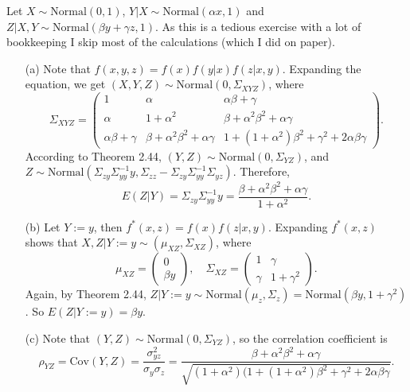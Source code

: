 Let $X \sim \mathrm{Normal}(0, 1)$, $Y|X \sim \mathrm{Normal}(\alpha x, 1)$ and $Z|X,Y \sim \mathrm{Normal}(\beta y + \gamma z, 1)$.
As this is a tedious exercise with a lot of bookkeeping I skip most of the calculations (which I did on paper).
\begin{itemize}
    \item[(a)] Note that $f(x, y, z) = f(x)f(y|x)f(z|x,y)$.
        Expanding the equation, we get $(X, Y, Z) \sim \mathrm{Normal}(0, \Sigma_{XYZ})$, where
        \begin{equation*}
            \Sigma_{XYZ} = \begin{pmatrix}
                1 & \alpha & \alpha \beta + \gamma \\
                \alpha & 1 + \alpha^2 & \beta + \alpha^2 \beta^2 + \alpha \gamma \\
                \alpha \beta + \gamma & \beta + \alpha^2 \beta^2 + \alpha \gamma & 1 + (1 + \alpha^2) \beta^2 + \gamma^2 + 2 \alpha \beta \gamma
            \end{pmatrix}.
        \end{equation*}
        According to Theorem 2.44, $(Y,Z) \sim \mathrm{Normal}(0, \Sigma_{YZ})$, and $Z \sim \mathrm{Normal}(\Sigma_{zy} \Sigma_{yy}^{-1} y, \Sigma_{zz} - \Sigma_{zy} \Sigma_{yy}^{-1} \Sigma_{yz})$.
        Therefore,
        \begin{equation*}
            E(Z|Y) = \Sigma_{zy} \Sigma_{yy}^{-1} y
                = \frac{\beta + \alpha^2 \beta^2 + \alpha \gamma}{1 + \alpha^2}.
        \end{equation*}
    \item[(b)] Let $Y := y$, then $f^*(x, z) = f(x)f(z|x,y)$.
        Expanding $f^*(x,z)$ shows that $X,Z|Y:=y \sim (\mu_{XZ}, \Sigma_{XZ})$, where
        \begin{equation*}
            \mu_{XZ} = \begin{pmatrix}
                0 \\
                \beta y
            \end{pmatrix}, \quad
            \Sigma_{XZ} = \begin{pmatrix}
                1 & \gamma \\
                \gamma & 1 + \gamma^2
            \end{pmatrix}.
        \end{equation*}
        Again, by Theorem 2.44, $Z|Y:=y \sim \mathrm{Normal}(\mu_z, \Sigma_z) = \mathrm{Normal}(\beta y, 1 + \gamma^2)$.
        So $E(Z|Y:=y) = \beta y$.
    \item[(c)] Note that $(Y, Z) \sim \mathrm{Normal}(0, \Sigma_{YZ})$, so the correlation coefficient is
        \begin{equation*}
            \rho_{YZ} = \mathrm{Cov}(Y, Z)
                = \frac{\sigma_{yz}^2}{\sigma_y \sigma_z}
                = \frac{\beta + \alpha^2 \beta^2 + \alpha \gamma}{\sqrt{(1 + \alpha^2)(1 + (1 + \alpha^2) \beta^2 + \gamma^2 + 2 \alpha \beta \gamma}}.
        \end{equation*}
\end{itemize}

